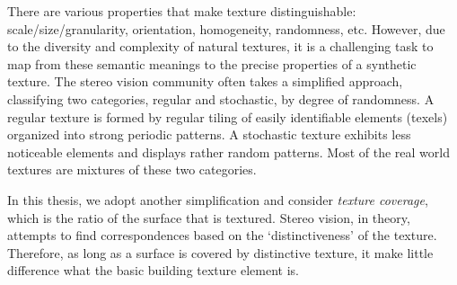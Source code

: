 There are various properties that make texture distinguishable: scale/size/granularity, orientation, homogeneity, randomness, etc. However, due to the diversity and complexity of natural textures, it is a challenging task to map from these semantic meanings to the precise properties of a synthetic texture. The stereo vision community often takes a simplified approach, classifying two categories, regular and stochastic, by degree of randomness. A regular texture is formed by regular tiling of easily identifiable elements (texels) organized into strong periodic patterns. A stochastic texture exhibits less noticeable elements and displays rather random patterns. Most of the real world textures are mixtures of these two categories.

In this thesis, we adopt another simplification and consider \textit{texture coverage}, which is the ratio of the surface that is textured. Stereo vision, in theory, attempts to find correspondences based on the `distinctiveness' of the texture. Therefore, as long as a surface is covered by distinctive texture, it make little difference what the basic building texture element is.




